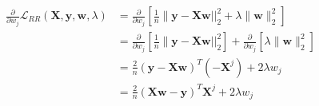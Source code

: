 \newcommand{\matrix}[1]{\mathbf{#1}}
\newcommand{\vector}[1]{\mathbf{#1}}
\newcommand{\X}{\matrix{X}}
\newcommand{\y}{\vector{y}}
\newcommand{\w}{\vector{w}}
\newcommand{\r}{\vector{r}}
\begin{align*}
\frac{\partial}{\partial w_j} \mathcal{L}_{\textit{RR}}(\X,\y,\w,\lambda) &= \frac{\partial}{\partial w_j} \left[ \frac{1}{n} \|\y - \X\w||_2^2 + \lambda \|\w\|_2^2 \right] \\
&= \frac{\partial}{\partial w_j} \left[ \frac{1}{n} \|\y - \X\w||_2^2 \right] + \frac{\partial}{\partial w_j} \left[ \lambda \|\w\|_2^2 \right] \\
&= \frac{2}{n} (\y - \X\w)^T (-\X^j) + 2 \lambda w_j \\
&= \frac{2}{n} (\X\w - \y)^T \X^j + 2 \lambda w_j \\
\end{align*}
